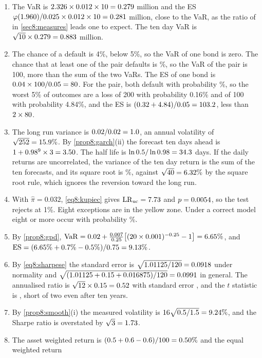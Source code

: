 \begin{chapterrefs}
\begin{enumerate}[label=\textbf{8.\arabic*}, leftmargin=*]
  \item The VaR is $2.326\times0.012\times10=0.279$ million and the ES
  $\varphi(1.960)/0.025\times0.012\times10=0.281$ million, close to the VaR, as the ratio of
  \esRatioNormal{} in \cref{sec8:measures} leads one to expect. The ten day VaR is $\sqrt{10}\times0.279=0.883$ million.
  \item The chance of a default is 4\%, below 5\%, so the VaR of one bond is zero. The chance that at
  least one of the pair defaults is \xbJoint\%, so the VaR of the pair is 100, more than the sum of the
  two VaRs. The ES of one bond is $0.04\times100/0.05=80$. For the pair, both default with
  probability \xbBoth\%, so the worst 5\% of outcomes are a loss of 200 with probability 0.16\% and of 100
  with probability 4.84\%, and the ES is $(0.32+4.84)/0.05=103.2$, less than $2\times80$.
  \item The long run variance is $0.02/0.02=1.0$, an annual volatility of $\sqrt{252}=15.9\%$. By
  \cref{prop8:garch}(ii) the forecast ten days ahead is $1+0.98^9\times3=3.50$. The half life is
  $\ln0.5/\ln0.98=34.3$ days. If the daily returns are uncorrelated, the variance of the ten day return is the sum of the ten
  forecasts, and its square
  root is \xcTenDay\%, against $\sqrt{40}=6.32\%$ by the square root rule, which ignores the
  reversion toward the long run.
  \item With $\hat\pi=0.032$, \cref{eq8:kupiec} gives $\mathrm{LR}_{\mathrm{uc}}=7.73$ and $p=0.0054$, so
  the test rejects at 1\%. Eight exceptions are in the yellow zone. Under a correct model eight or more
  occur with probability \xdTail\%.
  \item By \cref{prop8:gpd}, $\mathrm{VaR}=0.02+\frac{0.007}{0.25}\bigl[(20\times0.001)^{-0.25}-1\bigr]=6.65\%$,
  and $\mathrm{ES}=(6.65\%+0.7\%-0.5\%)/0.75=9.13\%$.
  \item By \cref{eq8:sharpese} the standard error is $\sqrt{1.01125/120}=0.0918$ under normality and
  $\sqrt{(1.01125+0.15+0.016875)/120}=0.0991$ in general. The annualised ratio is $\sqrt{12}\times0.15=0.52$
  with standard error \xfAnnSe, and the $t$ statistic is \xfT, short of two even after ten years.
  \item By \cref{prop8:smooth}(i) the measured volatility is $16\sqrt{0.5/1.5}=9.24\%$, and the Sharpe
  ratio is overstated by $\sqrt3=1.73$.
  \item The asset weighted return is $(0.5+0.6-0.6)/100=0.50\%$ and the equal weighted return

\end{enumerate}
\end{chapterrefs}
